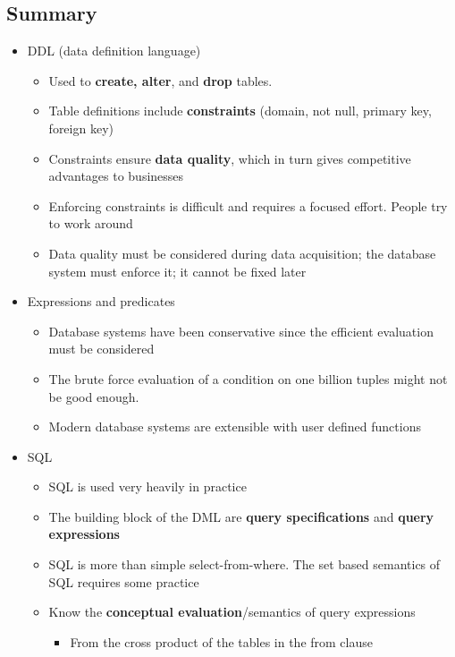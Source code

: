 \subsection{Summary}
\begin{itemize}[label=\(\rhd\)]
    \item DDL (data definition language)
    \begin{itemize}[label=\(\rhd\)]
        \item Used to \textbf{create, alter}, and \textbf{drop} tables.
        \item Table definitions include \textbf{constraints} (domain, not null, primary key, foreign key)
        \item Constraints ensure \textbf{data quality}, which in turn gives competitive advantages to businesses
        \item Enforcing constraints is difficult and requires a focused effort. People try to work around
        \item Data quality must be considered during data acquisition; the database system must enforce it; it cannot be fixed later
    \end{itemize}
    \item Expressions and predicates
    \begin{itemize}[label=\(\rhd\)]
        \item Database systems have been conservative since the efficient evaluation must be considered
        \item The brute force evaluation of a condition on one billion tuples might not be good enough.
        \item Modern database systems are extensible with user defined functions
    \end{itemize}
    \item SQL
    \begin{itemize}[label=\(\rhd\)]
        \item SQL is used very heavily in practice
        \item The building block of the DML are \textbf{query specifications} and \textbf{query expressions}
        \item SQL is more than simple select-from-where. The set based semantics of SQL requires some practice
        \item Know the \textbf{conceptual evaluation}/semantics of query expressions
        \begin{itemize}[label=\(\rhd\)]
            \item From the cross product of the tables in the from clause

\end{itemize}
\end{itemize}
\end{itemize}
